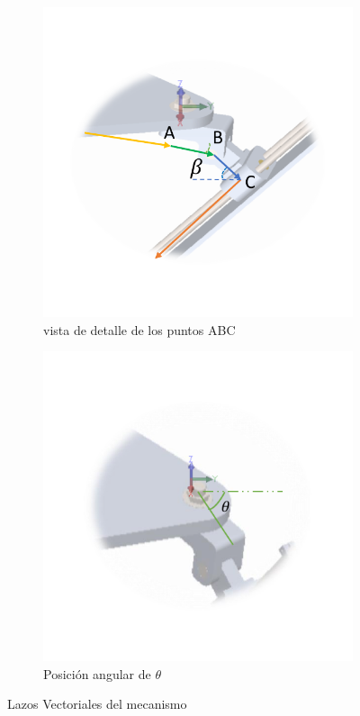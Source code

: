 \begin{figure}[htb!]
\begin{subfigure}{0.45\textwidth}
        \includegraphics[width=0.9\linewidth]{Cap4_DisenoBasico/Figura/PDFLAZOS2.pdf}
        \caption{vista de detalle de los puntos ABC}
        \label{fig:LazosVectorialesABC}
    \end{subfigure}
    \begin{subfigure}{0.45\textwidth}
        \includegraphics[width=0.9\linewidth]{Cap4_DisenoBasico/Figura/PDFLAZOS3.pdf}
        \caption{Posición angular de $ \theta $}
        \label{fig:LazosVectorialesTheta}
    \end{subfigure}
    \caption{Lazos Vectoriales del mecanismo}
    \label{fig:LazosVectoriales}
\end{figure}

